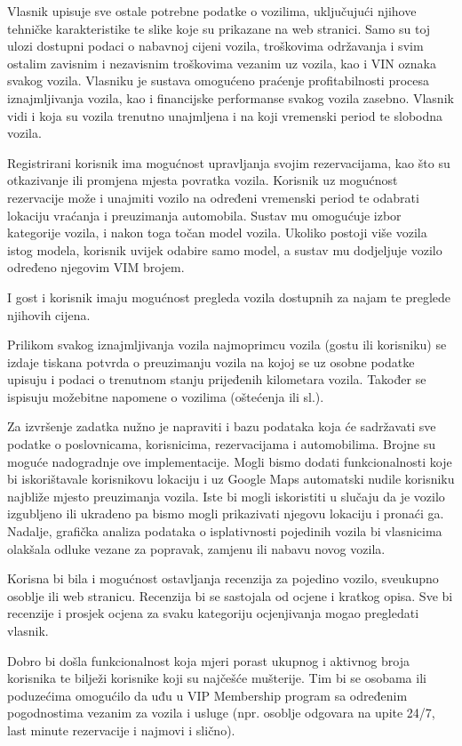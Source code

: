 \text Vlasnik upisuje sve ostale potrebne podatke o vozilima, uključujući njihove tehničke
karakteristike te slike koje su prikazane na web stranici. Samo su toj ulozi 
dostupni podaci o nabavnoj cijeni vozila, troškovima održavanja i svim ostalim zavisnim
i nezavisnim troškovima vezanim uz vozila, kao i VIN oznaka svakog vozila.
Vlasniku je sustava omogućeno praćenje profitabilnosti procesa
iznajmljivanja vozila, kao i financijske performanse svakog vozila zasebno. Vlasnik vidi i koja su vozila trenutno unajmljena i na koji vremenski period te slobodna vozila. \par 
\text Registrirani korisnik ima mogućnost upravljanja svojim rezervacijama, kao što su otkazivanje ili promjena mjesta povratka vozila. Korisnik uz mogućnost rezervacije može i unajmiti vozilo na određeni vremenski period te odabrati lokaciju vraćanja i preuzimanja automobila. Sustav
mu omogućuje izbor kategorije vozila, i nakon toga točan model vozila. Ukoliko postoji
više vozila istog modela, korisnik uvijek odabire samo model, a sustav mu dodjeljuje
vozilo određeno njegovim VIM brojem. \par 
\text I gost i korisnik imaju mogućnost pregleda vozila dostupnih za najam te preglede njihovih cijena. \par 
 \text Prilikom svakog iznajmljivanja vozila najmoprimcu vozila (gostu ili korisniku) se izdaje tiskana potvrda o
preuzimanju vozila na kojoj se uz osobne podatke upisuju i podaci o trenutnom stanju
prijeđenih kilometara vozila. Također se ispisuju možebitne napomene o vozilima (oštećenja ili sl.).\par 
 \text Za izvršenje zadatka nužno je napraviti i bazu podataka koja će sadržavati sve podatke o poslovnicama, korisnicima, rezervacijama i automobilima. 
 \text Brojne su moguće nadogradnje ove implementacije. Mogli bismo dodati funkcionalnosti koje bi iskorištavale korisnikovu lokaciju i uz Google Maps automatski nudile korisniku najbliže mjesto preuzimanja vozila. Iste bi mogli iskoristiti u slučaju da je vozilo izgubljeno ili ukradeno pa bismo mogli prikazivati njegovu lokaciju i pronaći ga. 
\text Nadalje, grafička analiza podataka o isplativnosti pojedinih vozila bi vlasnicima olakšala odluke vezane za popravak, zamjenu ili nabavu novog vozila. \par 
\text Korisna bi bila i mogućnost ostavljanja recenzija za pojedino vozilo, sveukupno osoblje ili web stranicu. Recenzija bi se sastojala od ocjene i kratkog opisa. Sve bi recenzije i prosjek ocjena za svaku kategoriju ocjenjivanja mogao pregledati vlasnik. \par 
\text Dobro bi došla  funkcionalnost koja mjeri porast ukupnog i aktivnog broja korisnika te bilježi korisnike koji su najčešće mušterije. Tim bi se osobama ili poduzećima omogućilo da uđu u VIP Membership program sa određenim pogodnostima vezanim za vozila i usluge (npr. osoblje odgovara na upite 24/7, last minute rezervacije i najmovi i slično).   \par  
		\eject
		
		
		
	